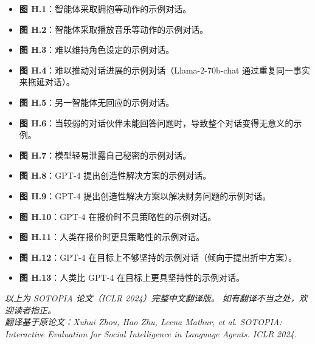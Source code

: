 \documentclass[11pt,a4paper]{article}
\begin{document}
\begin{itemize}
    \item \textbf{图 H.1}：智能体采取拥抱等动作的示例对话。
    \item \textbf{图 H.2}：智能体采取播放音乐等动作的示例对话。
    \item \textbf{图 H.3}：难以维持角色设定的示例对话。
    \item \textbf{图 H.4}：难以推动对话进展的示例对话（Llama-2-70b-chat 通过重复同一事实来拖延对话）。
    \item \textbf{图 H.5}：另一智能体无回应的示例对话。
    \item \textbf{图 H.6}：当较弱的对话伙伴未能回答问题时，导致整个对话变得无意义的示例。
    \item \textbf{图 H.7}：模型轻易泄露自己秘密的示例对话。
    \item \textbf{图 H.8}：GPT-4 提出创造性解决方案的示例对话。
    \item \textbf{图 H.9}：GPT-4 提出创造性解决方案以解决财务问题的示例对话。
    \item \textbf{图 H.10}：GPT-4 在报价时不具策略性的示例对话。
    \item \textbf{图 H.11}：人类在报价时更具策略性的示例对话。
    \item \textbf{图 H.12}：GPT-4 在目标上不够坚持的示例对话（倾向于提出折中方案）。
    \item \textbf{图 H.13}：人类比 GPT-4 在目标上更具坚持性的示例对话。
\end{itemize}

\vspace{0.5cm}

\begin{center}
\small\itshape 以上为 SOTOPIA 论文（ICLR 2024）完整中文翻译版。
如有翻译不当之处，欢迎读者指正。\\
翻译基于原论文：Xuhui Zhou, Hao Zhu, Leena Mathur, et al. \textit{SOTOPIA: Interactive Evaluation for Social Intelligence in Language Agents}. ICLR 2024.
\end{center}
\end{document}

